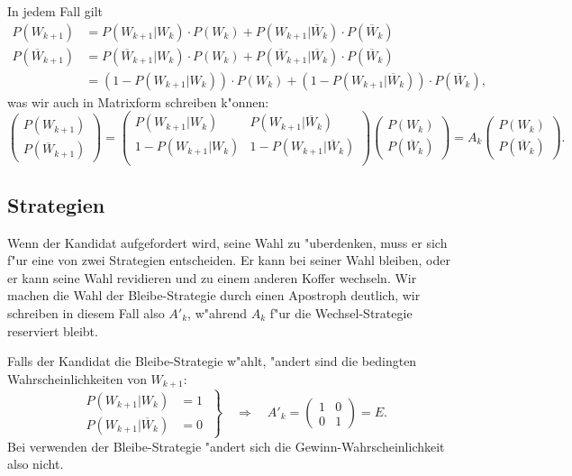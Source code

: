 In jedem Fall gilt
\begin{align*}
P(W_{k+1})
&=
P(W_{k+1}|W_k)\cdot P(W_k) + P(W_{k+1}|\overline{W}_k)\cdot  P(\overline{W}_k)\\
P(\overline{W}_{k+1})
&=
P(\overline{W}_{k+1}|W_k)\cdot P(W_k) + P(\overline{W}_{k+1}|\overline{W}_k)\cdot  P(\overline{W}_k)\\
&=
(1-P(W_{k+1}|W_k))\cdot P(W_k) + (1-P(W_{k+1}|\overline{W}_k))\cdot  P(\overline{W}_k),
\end{align*}
was wir auch in Matrixform schreiben k"onnen:
\[
\begin{pmatrix}
P(W_{k+1})\\P(\overline{W}_{k+1})
\end{pmatrix}
=
\begin{pmatrix}
P(W_{k+1}|W_k)&P(W_{k+1}|\overline{W}_k)\\
1-P(W_{k+1}|W_k)&1-P(W_{k+1}|\overline{W}_k)\\
\end{pmatrix}
\begin{pmatrix}
P(W_{k})\\P(\overline{W}_{k})
\end{pmatrix}
=
A_k
\begin{pmatrix}
P(W_{k})\\P(\overline{W}_{k})
\end{pmatrix}.
\]

\subsection{Strategien}
Wenn der Kandidat aufgefordert wird, seine Wahl zu "uberdenken, muss
er sich f"ur eine von zwei Strategien entscheiden. Er kann bei seiner
Wahl bleiben, oder er kann seine Wahl revidieren und zu einem anderen
Koffer wechseln.
Wir machen die Wahl der Bleibe-Strategie durch einen Apostroph 
deutlich, wir schreiben in diesem Fall also $A'_k$, w"ahrend $A_k$
f"ur die Wechsel-Strategie reserviert bleibt.

Falls der Kandidat die Bleibe-Strategie w"ahlt, "andert sind die
bedingten Wahrscheinlichkeiten von $W_{k+1}$:
\[
\left.
\begin{aligned}
P(W_{k+1}|W_k)
&=
1
\\
P(W_{k+1}|\overline{W}_k)
&=
0
\end{aligned}
\;
\right\}\quad\Rightarrow\quad A'_k=\begin{pmatrix}1&0\\0&1\end{pmatrix}=E.
\]
Bei verwenden der Bleibe-Strategie "andert sich die Gewinn-Wahrscheinlichkeit
also nicht.

